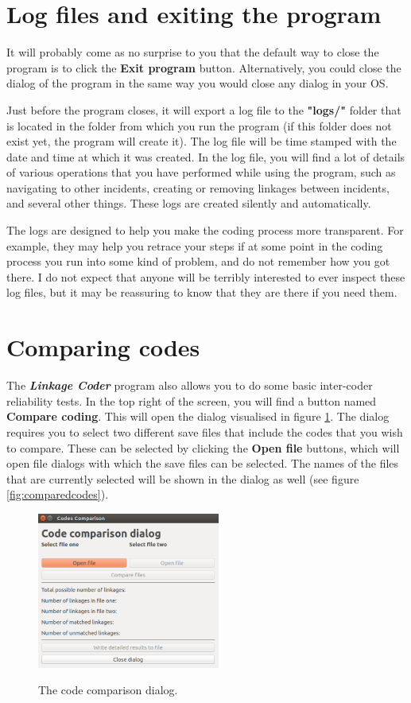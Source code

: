 \documentclass{memoir}
\begin{document}
\section{Log files and exiting the program}
\label{sec:logfilesandexiting}

It will probably come as no surprise to you that the default way to close the program is to click the \textbf{Exit program} button. Alternatively, you could close the dialog of the program in the same way you would close any dialog in your OS.

Just before the program closes, it will export a log file to the \textbf{"logs/"} folder that is located in the folder from which you run the program (if this folder does not exist yet, the program will create it). The log file will be time stamped with the date and time at which it was created. In the log file, you will find a lot of details of various operations that you have performed while using the program, such as navigating to other incidents, creating or removing linkages between incidents, and several other things. These logs are created silently and automatically.

The logs are designed to help you make the coding process more transparent. For example, they may help you retrace your steps if at some point in the coding process you run into some kind of problem, and do not remember how you got there. I do not expect that anyone will be terribly interested to ever inspect these log files, but it may be reassuring to know that they are there if you need them.  

\section{Comparing codes}
\label{sec:comparingcodes}

The \emph{\textbf{Linkage Coder}} program also allows you to do some basic inter-coder reliability tests. In the top right of the screen, you will find a button named \textbf{Compare coding}. This will open the dialog visualised in figure \ref{fig:codecomparisondialog}. The dialog requires you to select two different save files that include the codes that you wish to compare. These can be selected by clicking the \textbf{Open file} buttons, which will open file dialogs with which the save files can be selected. The names of the files that are currently selected will be shown in the dialog as well (see figure \ref{fig:comparedcodes}). 

\begin{figure}[h!]
  \centering
  \caption{The code comparison dialog.}
  \includegraphics[width=60mm]{Screenshot_13.pdf}
  \label{fig:codecomparisondialog}
\end{figure}
\end{document}
